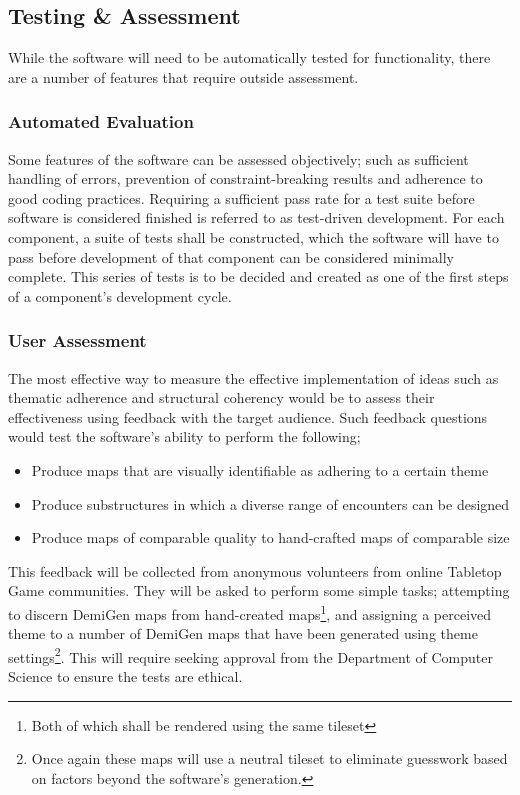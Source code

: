 \documentclass{article}
\begin{document}
\subsection{Testing \& Assessment}
While the software will need to be automatically tested for functionality, there are a number of features that require outside assessment. 

\subsubsection{Automated Evaluation}
Some features of the software can be assessed objectively; such as sufficient handling of errors, prevention of constraint-breaking results and adherence to good coding practices. Requiring a sufficient pass rate for a test suite before software is considered finished is referred to as test-driven development.
For each component, a suite of tests shall be constructed, which the software will have to pass before development of that component can be considered minimally complete. This series of tests is to be decided and created as one of the first steps of a component's development cycle. 

\subsubsection{User Assessment}
The most effective way to measure the effective implementation of ideas such as thematic adherence and structural coherency would be to assess their effectiveness using feedback with the target audience. Such feedback questions would test the software's ability to perform the following;
\begin{itemize}
    \item Produce maps that are visually identifiable as adhering to a certain theme
    \item Produce substructures in which a diverse range of encounters can be designed
    \item Produce maps of comparable quality to hand-crafted maps of comparable size
\end{itemize}

This feedback will be collected from anonymous volunteers from online Tabletop Game communities. They will be asked to perform some simple tasks; attempting to discern DemiGen maps from hand-created maps\footnote{Both of which shall be rendered using the same tileset}, and assigning a perceived theme to a number of DemiGen maps that have been generated using theme settings\footnote{Once again these maps will use a neutral tileset to eliminate guesswork based on factors beyond the software's generation.}. This will require seeking approval from the Department of Computer Science to ensure the tests are ethical.
\end{document}
